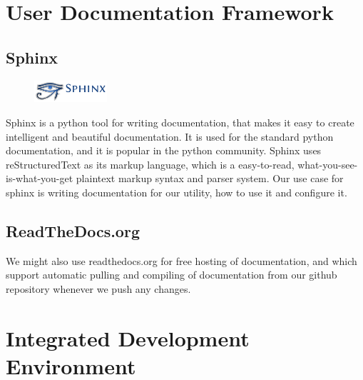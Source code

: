 \section{User Documentation Framework}
\label{sec:pre:docs}

\subsection{Sphinx}
\begin{figure}
	\begin{center}
	\vspace{-30pt}
		\includegraphics[width=2.7cm]{./planning/img/sphinx_logo}
	\vspace{-30pt}
	\end{center}
\end{figure}
Sphinx is a python tool for writing documentation, that makes it easy to create
intelligent and beautiful documentation. It is used for the standard python
documentation, and it is  popular in the python community. Sphinx uses
reStructuredText as its markup language, which is a easy-to-read,
what-you-see-is-what-you-get plaintext markup syntax and parser system. Our use
case for sphinx is writing documentation for our utility, how to use it and
configure it.

\subsection{ReadTheDocs.org}
We might also use readthedocs.org for free hosting of
documentation, and which support automatic pulling and compiling of
documentation from our github repository whenever we push any changes.


\section{Integrated Development Environment}
\label{sec:pre:ide}


